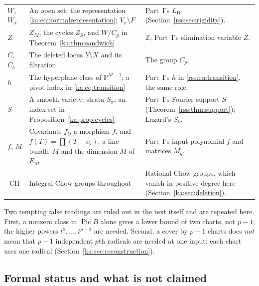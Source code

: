 \documentclass[11pt,a4paper]{article}
\theoremstyle{definition}
\theoremstyle{remark}
\newcommand{\Z}{\mathbb Z}
\newcommand{\Pic}{\operatorname{Pic}}
\newcommand{\Pj}{\mathbb P}
\newcommand{\CH}{\operatorname{CH}}
\begin{document}
\begin{center}
\begin{tabularx}{\textwidth}{@{}L{0.15\textwidth}>{\raggedright\arraybackslash}X>{\raggedright\arraybackslash}X@{}}
$W$, $W_\pi$ &
An open set; the representation \eqref{ka:eq:normalrepresentation};
$V_\pi\setminus F$ &
Part~I's $L_W$ (Section~\ref{rss:sec:rigidity}).\\
$Z$ &
$Z_M$, the cycles $Z_S$, and $W/C_p$ in Theorem~\ref{ka:thm:sandwich} &
$\Z$; Part~I's elimination variable $Z$.\\
$C$, $C_b$ &
The deleted locus $Y\setminus X$ and its filtration &
The group $C_p$.\\
$h$ &
The hyperplane class of $\Pj^{M-1}$; a pivot index in \eqref{ka:eq:transition} &
Part~I's $h$ in \eqref{rss:eq:transition}, the same role.\\
$S$ &
A smooth variety; strata $S_\pi$; an index set in Proposition~\ref{ka:prop:cycles} &
Part~I's Fourier support $S$ (Theorem~\ref{rss:thm:support}); Lazard's $S_k$.\\
$f$, $M$ &
Covariants $f_i$, a morphism $f$, and $f(T)=\prod(T-x_i)$; a line bundle
$M$ and the dimension $M$ of $E_M$ &
Part~I's input polynomial $f$ and matrices $M_q$.\\
$\CH$ &
Integral Chow groups throughout &
Rational Chow groups, which vanish in positive degree here
(Section~\ref{ka:sec:deletion}).\\
\bottomrule
\end{tabularx}
\end{center}

Two tempting false readings are ruled out in the text itself and are
repeated here. First, a nonzero class in $\Pic B$ alone gives a lower bound
of two charts, not $p-1$; the higher powers $t^2,\ldots,t^{p-2}$ are needed.
Second, a cover by $p-1$ charts does \emph{not} mean that $p-1$ independent
$p$th radicals are needed at one input: each chart uses one radical
(Section~\ref{ka:sec:reconstruction}).

\subsection{Formal status and what is not claimed}
\label{ka:sec:nonclaims}
\end{document}
